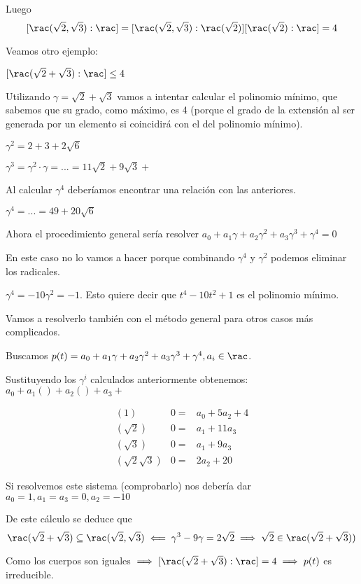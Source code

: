 \documentclass{apuntes}
\begin{document}
Luego \[[\rac(\sqrt{2},\sqrt{3}): \rac] = [\rac(\sqrt{2},\sqrt{3}): \rac(\sqrt{2})] [\rac(\sqrt{2}): \rac] = 4\]

Veamos otro ejemplo:
\begin{example}
$[\rac(\sqrt{2} + \sqrt{3}) : \rac] \leq 4$

Utilizando $\gamma = \sqrt{2} + \sqrt{3}$ vamos a intentar calcular el polinomio mínimo, que sabemos que su grado, como máximo, es 4 (porque el grado de la extensión al ser generada por un elemento si coincidirá con el del polinomio mínimo).

$\gamma^2 = 2+3+2\sqrt{6}$

$\gamma^3 = \gamma^2 · \gamma = ... = 11 \sqrt{2} + 9\sqrt{3} + $

Al calcular $\gamma^4$ deberíamos encontrar una relación con las anteriores.

$\gamma^4 = ... = 49 + 20\sqrt{6}$


Ahora el procedimiento general sería resolver $a_0 + a_1\gamma + a_2 \gamma^2 + a_3\gamma^3 + \gamma^4 = 0$

En este caso no lo vamos a hacer porque combinando $\gamma^4$ y $\gamma^2$ podemos eliminar los radicales.

$\gamma^4 = -10 \gamma^2 = -1$. Esto quiere decir que $t^4 - 10t^2 + 1$ es el polinomio mínimo.

Vamos a resolverlo también con el método general para otros casos más complicados.

Buscamos $p(t) = a_0+a_1\gamma+a_2\gamma^2 + a_3\gamma^3 + \gamma^4, a_i\in\rac$.

Sustituyendo  los $\gamma^i$ calculados anteriormente obtenemos: $a_0 + a_1() + a_2() + a_3 + $

\[
\begin{array}{ccc}
(1) & 0 =& a_0 + 5a_2 + 4\\
(\sqrt{2}) & 0 =& a_1 + 11a_3\\
(\sqrt{3}) & 0 =& a_1 + 9a_3\\
(\sqrt{2}\sqrt{3}) & 0 =& 2a_2 + 20
\end{array}
\]

Si resolvemos este sistema (comprobarlo) nos debería dar $a_0 = 1, a_1=a_3=0,a_2 = -10$
\end{example}
\begin{corol}
De este cálculo se deduce que \[\rac(\sqrt{2} + \sqrt{3}) \subseteq \rac(\sqrt{2},\sqrt{3}) \impliedby \gamma^3 - 9\gamma = 2\sqrt{2} \implies \sqrt{2}\in\rac(\sqrt{2} + \sqrt{3}))\]

Como los cuerpos son iguales $\implies [\rac(\sqrt{2}+\sqrt{3}) : \rac] = 4 \implies p(t)$ es irreducible.
\end{corol}
\end{document}
